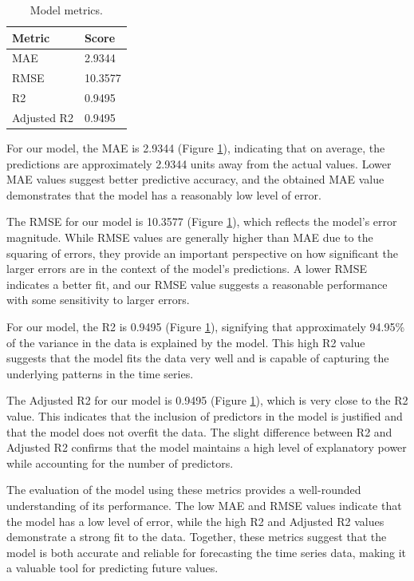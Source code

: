 \begin{table}[H]
  \centering
  \begin{tabular}{ll}
    \toprule
    \textbf{Metric} & \textbf{Score} \\ \midrule
    MAE             & 2.9344         \\ \midrule
    RMSE            & 10.3577        \\ \midrule
    R2              & 0.9495         \\ \midrule
    Adjusted R2     & 0.9495         \\ \bottomrule
  \end{tabular}
  \caption{Model metrics.}
  \label{table:model-metrics}
\end{table}

For our model, the MAE is 2.9344 (Figure \ref{table:model-metrics}), indicating
that on average, the predictions are approximately 2.9344 units away from the
actual values. Lower MAE values suggest better predictive accuracy, and the
obtained MAE value demonstrates that the model has a reasonably low level of error.

The RMSE for our model is 10.3577 (Figure \ref{table:model-metrics}),
which reflects the model's error magnitude.
While RMSE values are generally higher than MAE due to the squaring of errors,
they provide an important perspective on how significant the larger errors are
in the context of the model's predictions. A lower RMSE indicates a better fit,
and our RMSE value suggests a reasonable performance with some sensitivity to larger errors.

For our model, the R2 is 0.9495 (Figure \ref{table:model-metrics}), signifying
that approximately 94.95\% of the variance in the data is explained by the model.
This high R2 value suggests that the model fits the data very well and is capable
of capturing the underlying patterns in the time series.

The Adjusted R2 for our model is 0.9495 (Figure \ref{table:model-metrics}),
which is very close to the R2 value. This indicates that the inclusion of
predictors in the model is justified and that the model does not overfit the data.
The slight difference between R2 and Adjusted R2 confirms that the model maintains
a high level of explanatory power while accounting for the number of predictors.

The evaluation of the model using these metrics provides a well-rounded
understanding of its performance. The low MAE and RMSE values indicate
that the model has a low level of error, while the high R2 and Adjusted
R2 values demonstrate a strong fit to the data. Together, these metrics
suggest that the model is both accurate and reliable for forecasting the
time series data, making it a valuable tool for predicting future values.

